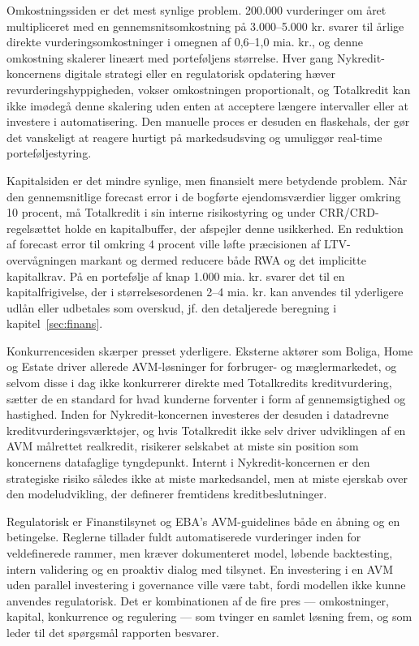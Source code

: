 \documentclass[12pt]{article}
\begin{document}
Omkostningssiden er det mest synlige problem. 200.000 vurderinger om året multipliceret med en gennemsnitsomkostning på 3.000--5.000 kr. svarer til årlige direkte vurderingsomkostninger i omegnen af 0,6--1,0 mia. kr., og denne omkostning skalerer lineært med porteføljens størrelse. Hver gang Nykredit-koncernens digitale strategi eller en regulatorisk opdatering hæver revurderingshyppigheden, vokser omkostningen proportionalt, og Totalkredit kan ikke imødegå denne skalering uden enten at acceptere længere intervaller eller at investere i automatisering. Den manuelle proces er desuden en flaskehals, der gør det vanskeligt at reagere hurtigt på markedsudsving og umuliggør real-time porteføljestyring.

Kapitalsiden er det mindre synlige, men finansielt mere betydende problem. Når den gennemsnitlige forecast error i de bogførte ejendomsværdier ligger omkring 10 procent, må Totalkredit i sin interne risikostyring og under CRR/CRD-regelsættet holde en kapitalbuffer, der afspejler denne usikkerhed. En reduktion af forecast error til omkring 4 procent ville løfte præcisionen af LTV-overvågningen markant og dermed reducere både RWA og det implicitte kapitalkrav. På en portefølje af knap 1.000 mia. kr. svarer det til en kapitalfrigivelse, der i størrelsesordenen 2--4 mia. kr. kan anvendes til yderligere udlån eller udbetales som overskud, jf. den detaljerede beregning i kapitel~\ref{sec:finans}.

Konkurrencesiden skærper presset yderligere. Eksterne aktører som Boliga, Home og Estate driver allerede AVM-løsninger for forbruger- og mæglermarkedet, og selvom disse i dag ikke konkurrerer direkte med Totalkredits kreditvurdering, sætter de en standard for hvad kunderne forventer i form af gennemsigtighed og hastighed. Inden for Nykredit-koncernen investeres der desuden i datadrevne kreditvurderingsværktøjer, og hvis Totalkredit ikke selv driver udviklingen af en AVM målrettet realkredit, risikerer selskabet at miste sin position som koncernens datafaglige tyngdepunkt. Internt i Nykredit-koncernen er den strategiske risiko således ikke at miste markedsandel, men at miste ejerskab over den modeludvikling, der definerer fremtidens kreditbeslutninger.

Regulatorisk er Finanstilsynet og EBA's AVM-guidelines både en åbning og en betingelse. Reglerne tillader fuldt automatiserede vurderinger inden for veldefinerede rammer, men kræver dokumenteret model, løbende backtesting, intern validering og en proaktiv dialog med tilsynet. En investering i en AVM uden parallel investering i governance ville være tabt, fordi modellen ikke kunne anvendes regulatorisk. Det er kombinationen af de fire pres --- omkostninger, kapital, konkurrence og regulering --- som tvinger en samlet løsning frem, og som leder til det spørgsmål rapporten besvarer.
\end{document}
